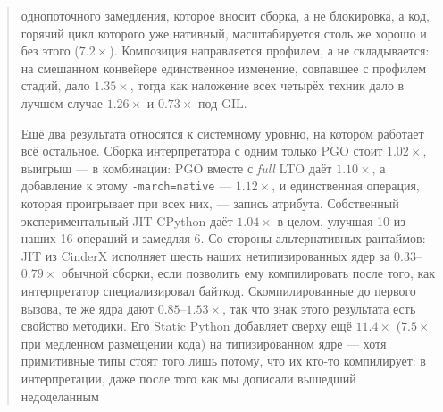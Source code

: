 \documentclass[10pt,a4paper]{article}
\newcommand{\meas}[2]{#2}
\newcommand{\code}[1]{\texttt{\small #1}}
\begin{document}
\begin{abstract}
однопоточного замедления, которое вносит сборка, а не блокировка, а код, горячий цикл которого уже
нативный, масштабируется столь же хорошо и без этого ($\meas{ratio:b4_threads-gil:c_ffi_uniform/gil/T1|b4_threads-gil:c_ffi_uniform/gil/T8}{7.2}\times$). Композиция направляется
профилем, а не складывается: на смешанном конвейере единственное изменение, совпавшее с профилем
стадий, дало $\meas{ratio:b7_pipeline-gil:end_to_end/gil/v0_pure|b7_pipeline-gil:end_to_end/gil/v2_numba_native}{1.35}\times$, тогда как наложение всех четырёх техник дало в лучшем случае
$\meas{ratio:b7_pipeline-ft:end_to_end/ft/v0_pure|b7_pipeline-ft:end_to_end/ft/v4_all}{1.26}\times$ и $\meas{ratio:b7_pipeline-gil:end_to_end/gil/v0_pure|b7_pipeline-gil:end_to_end/gil/v4_all}{0.73}\times$ под GIL.

Ещё два результата относятся к системному уровню, на котором работает всё остальное. Сборка интерпретатора с одним
только PGO стоит $\meas{geomean:b5_buildcfg-plain|b5_buildcfg-pgo}{1.02}\times$, выигрыш --- в комбинации: PGO вместе с \emph{full} LTO даёт
$\meas{geomean:b5_buildcfg-plain|b5_buildcfg-pgo_ltofull}{1.10}\times$, а добавление к этому \code{-march=native} --- $\meas{geomean:b5_buildcfg-plain|b5_buildcfg-pgo_ltofull_native}{1.12}\times$, и единственная операция,
которая проигрывает при всех них, --- запись атрибута. Собственный экспериментальный JIT CPython
даёт $\meas{geomean:b5_buildcfg-plain|b5_buildcfg-jit}{1.04}\times$ в целом, улучшая 10 из наших 16 операций и замедляя 6. Со стороны
альтернативных рантаймов: JIT из CinderX исполняет шесть наших нетипизированных ядер за $0.33$--$\meas{ratio:b6_cinderx-fork_jit:binarytrees/fork_jit|b6_cinderx-stock:binarytrees/stock}{0.79}\times$ обычной сборки, если
позволить ему компилировать после того, как интерпретатор специализировал байткод. Скомпилированные
до первого вызова, те же ядра дают $0.85$--$\meas{ratio:b6_cinderx-jitopt_compile_at_first_call:matmul/jitopt_compile_at_first_call|b6_cinderx-stock:matmul/stock}{1.53}\times$, так что знак этого результата есть
свойство методики. Его Static Python добавляет сверху ещё $\meas{ratio:b6_static-fork_static_adaptive:matmul96_int/fork_static_adaptive/boxed_jit|b6_static-fork_static_adaptive:matmul96_int/fork_static_adaptive/static_jit}{11.4}\times$ ($\meas{ratio:b6_static-fork_static:matmul96_int/fork_static/boxed_jit|b6_static-fork_static:matmul96_int/fork_static/static_jit}{7.5}\times$ при
медленном размещении кода) на типизированном ядре --- хотя примитивные типы стоят того лишь потому,
что их кто-то компилирует: в интерпретации, даже после того как мы дописали вышедший недоделанным

\end{abstract}
\end{document}
